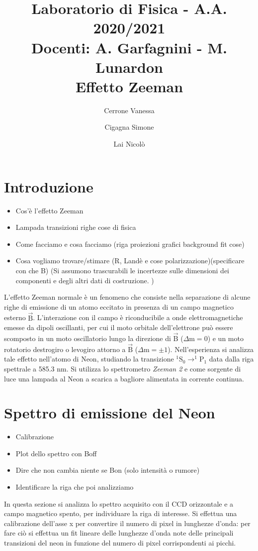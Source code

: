 \documentclass[twocolumn,10pt]{asme2ej}
\date{}
\title{{\huge\bfseries Laboratorio di Fisica} - {\LARGE A.A. 2020/2021} \\ 
    {\LARGE Docenti: A. Garfagnini - M. Lunardon} \\ {\Huge\bfseries Effetto Zeeman}}
\author{Cerrone Vanessa
    \affiliation{
    1200361\\
    vanessa.cerrone@studenti.unipd.it
    }	
}
\author{Cigagna Simone
    \affiliation{
	1193992\\
    simone.cigagna@studenti.unipd.it
    }	
}
\author{Lai Nicolò
    \affiliation{
	1193976\\
    nicolo.lai@studenti.unipd.it
    }	
}
\begin{document}
\maketitle    


\section{Introduzione}

\begin{itemize}
    \item Cos'è l'effetto Zeeman
    \item Lampada transizioni righe cose di fisica
    \item Come facciamo e cosa facciamo (riga proiezioni grafici background fit cose) 
    \item Cosa vogliamo trovare/stimare (R, Landè e cose polarizzazione)(specificare con che B) (Si assumono trascurabili le incertezze sulle dimensioni dei componenti e degli altri dati di costruzione.
    )
\end{itemize}
L'effetto Zeeman normale è un fenomeno che consiste nella separazione di alcune righe di emissione di un atomo eccitato in presenza di un campo magnetico esterno $\vec{\text{B}}$. L'interazione con il campo è riconducibile a onde elettromagnetiche emesse da dipoli oscillanti, per cui il moto orbitale dell'elettrone può 
essere scomposto in un moto oscillatorio lungo la direzione di $\vec{\text{B}}$ ($\Delta \text{m} = 0$) e un moto rotatorio destrogiro o levogiro attorno a $\vec{\text{B}}$ ($\Delta \text{m} = \pm1$).
Nell'esperienza si analizza tale effetto nell'atomo di Neon, studiando la transizione $ ^1\text{S}_0 \rightarrow ^1\text{P}_1$ data dalla riga spettrale a 585.3 \si{\nano \metre}.
Si utilizza lo spettrometro \textit{Zeeman 2} e come sorgente di luce una lampada al Neon a scarica a bagliore alimentata in corrente continua. 






\section{Spettro di emissione del Neon}

\begin{itemize}
    \item Calibrazione
    \item Plot dello spettro con Boff
    \item Dire che non cambia niente se Bon (solo intensità o rumore)
    \item Identificare la riga che poi analizziamo
\end{itemize}
In questa sezione si analizza lo spettro acquisito con il CCD orizzontale e a campo magnetico spento, per individuare la riga di interesse. 
Si effettua una calibrazione dell'asse x per convertire il numero di pixel in lunghezze d'onda: per fare ciò si effettua un fit lineare 
delle lunghezze d'onda note delle principali transizioni del neon in funzione del numero di pixel corrispondenti ai picchi. 
 
\end{document}
